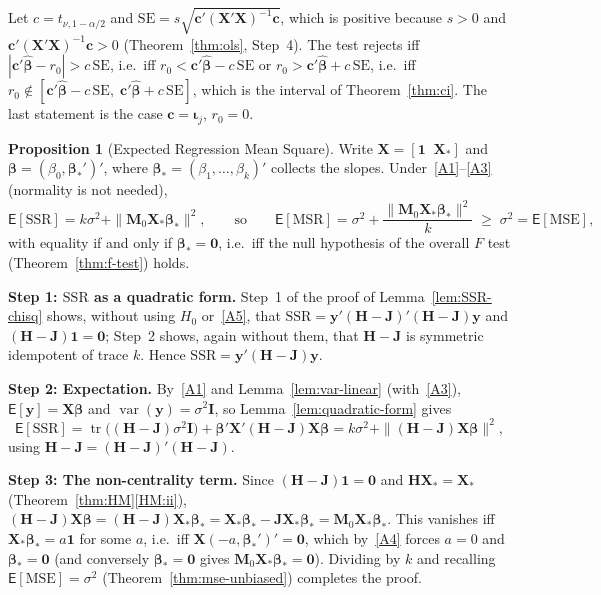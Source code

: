 \documentclass[12pt,a4paper]{article}
\makeatletter
\theoremstyle{definition}
\newtheorem{proposition}[theorem]{Proposition}
\renewenvironment{proof}[1][\proofname]{\par
  \pushQED{\qed}%
  \normalfont \topsep6\p@\@plus6\p@\relax
  \trivlist
  \item[\hskip\labelsep\bfseries #1\@addpunct{.}]\ignorespaces
}{%
  \popQED\endtrivlist\@endpefalse
}
\newcommand\expc{\mathsf{E}}
\DeclareMathOperator\var{var}
\DeclareMathOperator\tr{tr}
\newcommand{\SSR}{\mathrm{SSR}}
\newcommand{\MSR}{\mathrm{MSR}}
\newcommand{\MSE}{\mathrm{MSE}}
\newcommand{\SE}{\mathrm{SE}}
\newcommand{\bX}{\mathbf{X}}
\newcommand{\by}{\mathbf{y}}
\def\bb{\boldsymbol{\beta}}
\newcommand{\bI}{\mathbf{I}}
\newcommand{\bH}{\mathbf{H}}
\newcommand{\bM}{\mathbf{M}}
\def\bc{\mathbf{c}}
\newcommand{\bone}{\mathbf{1}}
\newcommand{\bzero}{\mathbf{0}}
\newcommand{\bJ}{\mathbf{J}}
\makeatother
\begin{document}
\begin{proof}
Let $c = t_{\nu,1-\alpha/2}$ and $\SE = s\sqrt{\bc'(\bX'\bX)^{-1}\bc}$, which is positive because $s > 0$ and $\bc'(\bX'\bX)^{-1}\bc > 0$ (Theorem~\ref{thm:ols}, Step~4). The test rejects iff $|\bc'\hat{\bb} - r_0| > c\,\SE$, i.e.\ iff $r_0 < \bc'\hat{\bb} - c\,\SE$ or $r_0 > \bc'\hat{\bb} + c\,\SE$, i.e.\ iff $r_0 \notin [\bc'\hat{\bb} - c\,\SE,\; \bc'\hat{\bb} + c\,\SE]$, which is the interval of Theorem~\ref{thm:ci}. The last statement is the case $\bc = \boldsymbol\iota_j$, $r_0 = 0$.
\end{proof}

\begin{proposition}[Expected Regression Mean Square]\label{prop:E-SSR}
Write $\bX = [\bone \;\; \bX_*]$ and $\bb = (\beta_0, \bb_*')'$, where $\bb_* = (\beta_1, \ldots, \beta_k)'$ collects the slopes. Under~\ref{A1}--\ref{A3} (normality is not needed),
\[
\expc[\SSR] = k\sigma^2 + \|\bM_0\bX_*\bb_*\|^2, \qquad\text{so}\qquad \expc[\MSR] = \sigma^2 + \frac{\|\bM_0\bX_*\bb_*\|^2}{k} \;\geqslant\; \sigma^2 = \expc[\MSE],
\]
with equality if and only if $\bb_* = \bzero$, i.e.\ iff the null hypothesis of the overall $F$ test (Theorem~\ref{thm:f-test}) holds.
\end{proposition}

\begin{proof}
\textbf{Step 1: $\SSR$ as a quadratic form.} Step~1 of the proof of Lemma~\ref{lem:SSR-chisq} shows, without using $H_0$ or~\ref{A5}, that $\SSR = \by'(\bH - \bJ)'(\bH - \bJ)\by$ and $(\bH - \bJ)\bone = \bzero$; Step~2 shows, again without them, that $\bH - \bJ$ is symmetric idempotent of trace $k$. Hence $\SSR = \by'(\bH - \bJ)\by$.

\textbf{Step 2: Expectation.} By~\ref{A1} and Lemma~\ref{lem:var-linear} (with~\ref{A3}), $\expc[\by] = \bX\bb$ and $\var(\by) = \sigma^2\bI$, so Lemma~\ref{lem:quadratic-form} gives
\[
\expc[\SSR] = \tr\bigl((\bH - \bJ)\sigma^2\bI\bigr) + \bb'\bX'(\bH - \bJ)\bX\bb = k\sigma^2 + \|(\bH - \bJ)\bX\bb\|^2,
\]
using $\bH - \bJ = (\bH - \bJ)'(\bH - \bJ)$.

\textbf{Step 3: The non-centrality term.} Since $(\bH - \bJ)\bone = \bzero$ and $\bH\bX_* = \bX_*$ (Theorem~\ref{thm:HM}\ref{HM:ii}), $(\bH - \bJ)\bX\bb = (\bH - \bJ)\bX_*\bb_* = \bX_*\bb_* - \bJ\bX_*\bb_* = \bM_0\bX_*\bb_*$. This vanishes iff $\bX_*\bb_* = a\bone$ for some $a$, i.e.\ iff $\bX(-a, \bb_*')' = \bzero$, which by~\ref{A4} forces $a = 0$ and $\bb_* = \bzero$ (and conversely $\bb_* = \bzero$ gives $\bM_0\bX_*\bb_* = \bzero$). Dividing by $k$ and recalling $\expc[\MSE] = \sigma^2$ (Theorem~\ref{thm:mse-unbiased}) completes the proof.
\end{proof}
\end{document}
